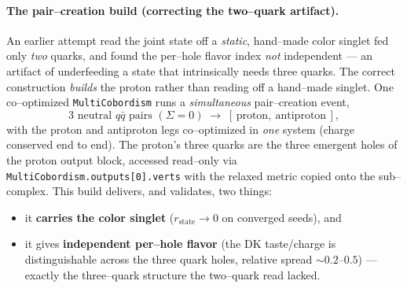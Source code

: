 \documentclass[11pt,oneside]{article}
\newcommand{\code}[1]{\texttt{#1}}
\begin{document}
\paragraph{The pair--creation build (correcting the two--quark artifact).}
An earlier attempt read the joint state off a \emph{static}, hand--made color
singlet fed only \emph{two} quarks, and found the per--hole flavor index
\emph{not} independent --- an artifact of underfeeding a state that
intrinsically needs three quarks. The correct construction \emph{builds} the
proton rather than reading off a hand--made singlet. One co--optimized
\code{MultiCobordism} runs a \emph{simultaneous} pair--creation event,
\begin{equation}
  3 \text{ neutral } q\bar q \text{ pairs } (\Sigma=0)
  \;\longrightarrow\; [\,\text{proton},\ \text{antiproton}\,],
\end{equation}
with the proton and antiproton legs co--optimized in \emph{one} system (charge
conserved end to end). The proton's three quarks are the three emergent holes of
the proton output block, accessed read--only via
\code{MultiCobordism.outputs[0].verts} with the relaxed metric copied onto the
sub--complex. This build delivers, and validates, two things:
\begin{itemize}[leftmargin=1.6em]
  \item it \textbf{carries the color singlet} ($r_{\text{state}}\to0$ on
        converged seeds), and
  \item it gives \textbf{independent per--hole flavor} (the DK taste/charge is
        distinguishable across the three quark holes, relative spread
        $\sim0.2$--$0.5$) --- exactly the three--quark structure the two--quark
        read lacked.
\end{itemize}
\end{document}
